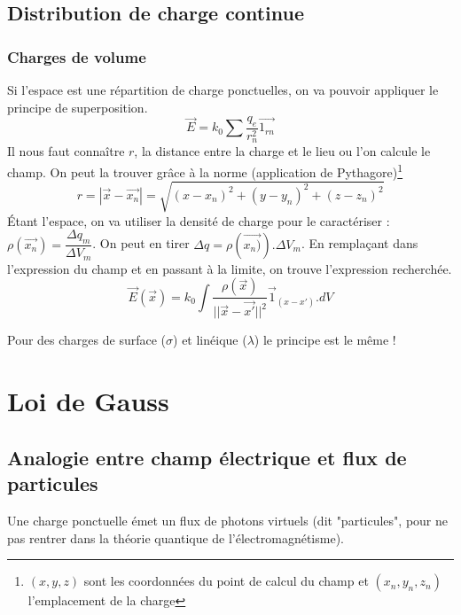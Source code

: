 \documentclass	[11pt, a4paper, openany]{book}
\begin{document}
\subsection{Distribution de charge continue}
\subsubsection{Charges de volume}
Si l'espace est une répartition de charge ponctuelles, on va pouvoir appliquer le principe de superposition.
\begin{equation}
\vec E = k_0 \sum \frac{q_e}{r^2_n}\vec{1_{rn}}
\end{equation}
Il nous faut connaître $r$, la distance entre la charge et le lieu ou l'on calcule le champ. On peut la trouver grâce à la norme (application de Pythagore)\footnote{$(x,y,z)$ sont les coordonnées du point de calcul du champ et $(x_n, y_n, z_n)$ l'emplacement de la charge}
\begin{equation}
r = |\vec{x} - \vec{x_n}| = \sqrt{(x-x_n)^2 + (y-y_n)^2 + (z-z_n)^2}
\end{equation}
Étant l'espace, on va utiliser la densité de charge pour le caractériser : $\rho(\vec{x_n}) = \dfrac{\Delta q_m}{\Delta V_m}$. On peut en tirer $\Delta q = \rho(\vec{x_n)}).\Delta V_m$. En remplaçant dans l'expression du champ et en passant à la limite, on trouve l'expression recherchée.
\begin{equation}
\vec{E}(\vec x) = k_0 \int \frac{\rho(\vec x)}{||\vec{x} - \vec{x'}||^2}\vec{1}_{(x-x')}.dV
\end{equation}

Pour des charges de surface ($\sigma$) et linéique ($\lambda$) le principe est le même ! 


\section{Loi de Gauss}
\subsection{Analogie entre champ électrique et flux de particules}
Une charge ponctuelle émet un flux de photons virtuels (dit "particules", pour ne pas rentrer dans la théorie quantique de l'électromagnétisme).
\end{document}
